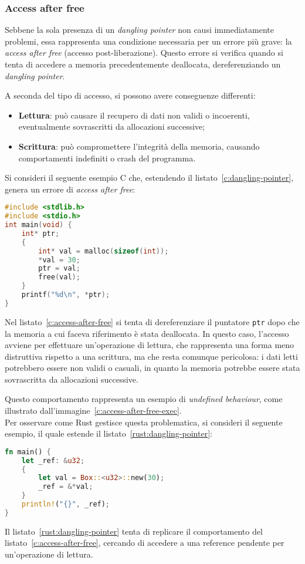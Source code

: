\subsubsection{Access after free}
Sebbene la sola presenza di un \textit{dangling pointer} non causi immediatamente problemi, essa rappresenta una condizione necessaria 
per un errore più grave: la \textit{access after free} (accesso post-liberazione).
Questo errore si verifica quando si tenta di accedere a memoria precedentemente deallocata, dereferenziando un \textit{dangling pointer}. 

A seconda del tipo
di accesso, si possono avere conseguenze differenti:
\begin{itemize}
    \item \textbf{Lettura}: può causare il recupero di dati non validi o incoerenti, eventualmente sovrascritti da allocazioni successive;
    \item \textbf{Scrittura}: può compromettere l'integrità della memoria, causando comportamenti indefiniti o crash del programma.
\end{itemize}
Si consideri il seguente esempio C che, estendendo il listato~\ref{c:dangling-pointer}, genera un errore di \textit{access after free}:
\begin{lstlisting}[language=C, caption={Access after free in C}, label={c:access-after-free}]
#include <stdlib.h>
#include <stdio.h>
int main(void) {
    int* ptr;
    {
        int* val = malloc(sizeof(int));
        *val = 30;
        ptr = val;
        free(val);
    }
    printf("%d\n", *ptr);
}
\end{lstlisting}
Nel listato~\ref{c:access-after-free} si tenta di dereferenziare il puntatore \texttt{ptr} dopo che la memoria a cui faceva riferimento è stata deallocata.
In questo caso, l'accesso avviene per effettuare un'operazione di lettura, che rappresenta una forma
 meno distruttiva rispetto a una scrittura, ma che resta comunque pericolosa:
i dati letti potrebbero essere non validi o casuali, in quanto la memoria potrebbe essere stata sovrascritta da allocazioni successive.
 
Questo comportamento rappresenta un esempio di \textit{undefined behaviour}, come illustrato
dall'immagine~\ref{c:access-after-free-exec}. \hfill
\vspace{12pt}\\
\noindent Per osservare come Rust gestisce questa problematica, si consideri il seguente esempio, il quale estende il listato~\ref{rust:dangling-pointer}:
\begin{lstlisting}[language=Rust, caption={Tentativo di access after free in Rust}, label={rust:access-after-free}]
fn main() {
    let _ref: &u32;
    {
        let val = Box::<u32>::new(30);
        _ref = &*val;
    }
    println!("{}", _ref);
}
\end{lstlisting}
Il listato~\ref{rust:dangling-pointer} tenta di replicare il comportamento del listato~\ref{c:access-after-free}, cercando 
di accedere a una reference pendente per un'operazione di lettura.

